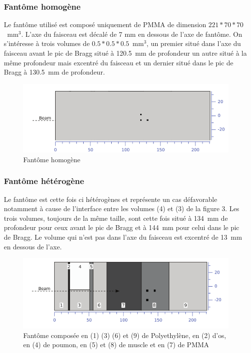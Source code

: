 \documentclass[11pt,a4paper,oldfontcommands]{memoir}
\begin{document}
\subsubsection{Fantôme homogène}

Le fantôme utilisé est composé uniquement de PMMA de dimension $221*70*70$~mm$^3$. L'axe du faisceau est décalé de 7 mm en dessous de l'axe de fantôme. On s'intéresse à trois volumes de $0.5*0.5*0.5$~mm$^3$, un premier situé dans l'axe du faisceau avant le pic de Bragg situé à 120.5~mm de profondeur un autre situé à la même profondeur mais excentré du faisceau et un dernier situé dans le pic de Bragg à 130.5~mm de profondeur.\\
\begin{figure}[h!]
    \centering
    \includegraphics[scale = 0.3]{homo/homofant.png}
    \caption{Fantôme homogène}
    \label{fant homo}
\end{figure}{}



\openany
\subsubsection{Fantôme hétérogène}

Le fantôme est cette fois ci hétérogènes et représente un cas défavorable notamment à cause de l'interface entre les volumes (4) et (3) de la figure 3. Les trois volumes, toujours de la même taille, sont cette fois situé à 134~mm de profondeur pour ceux avant le pic de Bragg et à 144~mm pour celui dans le pic de Bragg. Le volume qui n'est pas dans l'axe du faisceau est excentré de 13~mm en dessous de l'axe. 

\begin{figure}[h]
    \centering
    \includegraphics[scale = 0.3]{Parodi/heterofant.png}
    \caption{Fantôme composée en (1) (3) (6) et (9) de Polyethylène, en (2) d'os, en (4) de poumon, en (5) et (8) de muscle et en (7) de PMMA}
    \label{hetero phant}
\end{figure}{}
\end{document}
